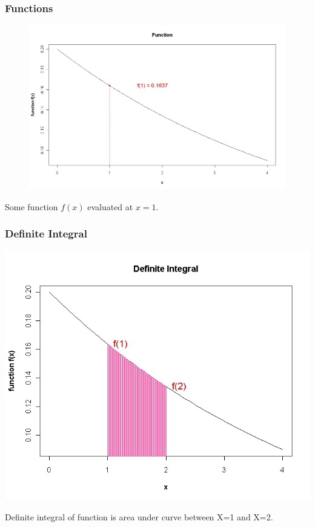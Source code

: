 \documentclass[IntroMain.tex]{subfiles}
\begin{document}
\begin{frame}
	\frametitle{Functions}
	
	\vspace{-0.5cm}
\begin{figure}
\centering
\includegraphics[width=0.7\linewidth]{images/6AFunction}
\caption{}
\label{fig:6AFunction}
\end{figure}

	
	Some function $f(x)$ evaluated at $x=1$.
\end{frame}
\begin{frame}
	\frametitle{Definite Integral}
	
	\vspace{-0.5cm}
\begin{center}
\includegraphics[scale=0.35]{images/6ADefiniteIntegral}
\end{center}
	Definite integral of function is area under curve between X=1 and X=2.
\end{frame}
\end{document}
